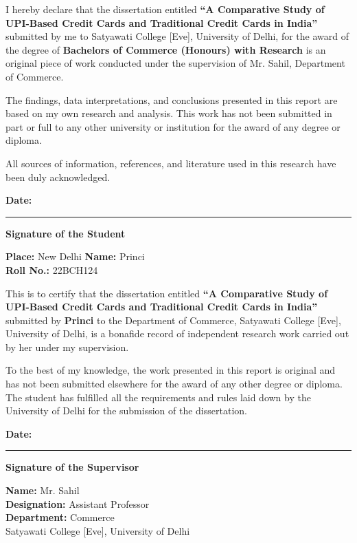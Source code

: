 
I hereby declare that the dissertation entitled \textbf{``A Comparative Study of UPI-Based Credit Cards and Traditional Credit Cards in India''} submitted by me to Satyawati College [Eve], University of Delhi, for the award of the degree of \textbf{Bachelors of Commerce (Honours) with Research} is an original piece of work conducted under the supervision of Mr. Sahil, Department of Commerce.

The findings, data interpretations, and conclusions presented in this report are based on my own research and analysis. This work has not been submitted in part or full to any other university or institution for the award of any degree or diploma.

All sources of information, references, and literature used in this research have been duly acknowledged.

\vspace{2cm}

\noindent \textbf{Date:} \rule{4cm}{0.4pt} \hfill \textbf{Signature of the Student}

\vspace{1cm}
\noindent \textbf{Place:} New Delhi \hfill \textbf{Name:} Princi \\
\null \hfill \textbf{Roll No.:} 22BCH124

\newpage


This is to certify that the dissertation entitled \textbf{``A Comparative Study of UPI-Based Credit Cards and Traditional Credit Cards in India''} submitted by \textbf{Princi} to the Department of Commerce, Satyawati College [Eve], University of Delhi, is a bonafide record of independent research work carried out by her under my supervision.

To the best of my knowledge, the work presented in this report is original and has not been submitted elsewhere for the award of any other degree or diploma. The student has fulfilled all the requirements and rules laid down by the University of Delhi for the submission of the dissertation.

\vspace{2cm}

\noindent \textbf{Date:} \rule{4cm}{0.4pt} \hfill \textbf{Signature of the Supervisor}

\vspace{1cm}
\noindent \hfill \textbf{Name:} Mr. Sahil \\
\null \hfill \textbf{Designation:} Assistant Professor \\
\null \hfill \textbf{Department:} Commerce \\
\null \hfill Satyawati College [Eve], University of Delhi
